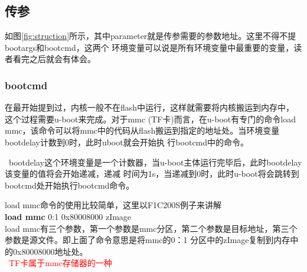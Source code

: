 \subsection{传参}
如图\ref{fig:struction}所示，其中parameter就是传参需要的参数地址。这里不得不提bootargs和bootcmd，这两个
环境变量可以说是所有环境变量中最重要的变量，读者看完之后就会有体会。

\subsubsection{bootcmd}
在最开始提到过，内核一般不在flash中运行，这样就需要将内核搬运到内存中，这个过程需要u-boot来完成。对于mmc
(TF卡)而言，在u-boot有专门的命令load 
mmc，该命令可以将mmc中的代码从flash搬运到指定的地址处。当环境变量bootdelay计数到0时，此时uboot就会开始执
行bootcmd中的命令。
\begin{tcolorbox}[colback=red!5!white,colframe=red!75!black]
	\faBellO\ 
	bootdelay这个环境变量是一个计数器，当u-boot主体运行完毕后，此时bootdelay该变量的值将会开始递减，递减
	时间为1s，当递减到0时，此时u-boot将会跳转到bootcmd处开始执行bootcmd命令。
\end{tcolorbox}
load mmc命令的使用比较简单，这里以F1C200S例子来讲解\\
\textbf{load mmc}  0:1 0x80008000 zImage  \\
load 
mmc有三个参数，第一个参数是mmc分区，第二个参数是目标地址，第三个参数是源文件。即上面了命令意思是将mmc的0：1
分区中的zImage复制到内存中的0x80008000地址处。\\
\textcolor{red}{\faCaretSquareORight \ TF卡属于mmc存储器的一种} 


